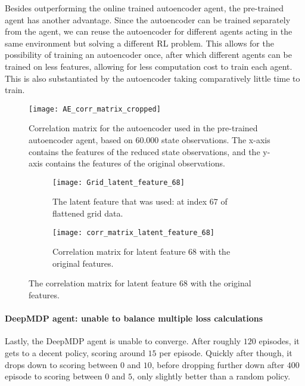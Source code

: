 Besides outperforming the online trained autoencoder agent, the pre-trained agent has another advantage. Since the autoencoder can be trained separately from the agent, we can reuse the autoencoder for different agents acting in the same environment but solving a different RL problem. This allows for the possibility of training an autoencoder once, after which different agents can be trained on less features, allowing for less computation cost to train each agent. This is also substantiated by the autoencoder taking comparatively little time to train.


\begin{figure}[h]
	\centering
	\texttt{[image: AE\_corr\_matrix\_cropped]}
	\caption{Correlation matrix for the autoencoder used in the pre-trained autoencoder agent, based on $60.000$ state observations. The x-axis contains the features of the reduced state observations, and the y-axis contains the features of the original observations.}
	\label{fig:ae-corr}
\end{figure}

\begin{figure}[h]
	\centering
	\begin{subfigure}[b]{0.2\textwidth}
		\texttt{[image: Grid\_latent\_feature\_68]}
		\caption{The latent feature that was used: at index $67$ of flattened grid data.}
		\label{fig:ae-latent-feature} 
	\end{subfigure}\hfill
	\begin{subfigure}[b]{0.75\textwidth}
		\texttt{[image: corr\_matrix\_latent\_feature\_68]}
		\caption{Correlation matrix for latent feature $68$ with the original features.}
		\label{fig:ae-latent-feature-corr-matrix}
	\end{subfigure}
	\caption{The correlation matrix for latent feature $68$ with the original features.}
	\label{fig:latent-feature-corr}
\end{figure}

\paragraph{DeepMDP agent: unable to balance multiple loss calculations}

Lastly, the DeepMDP agent is unable to converge. After roughly $120$ episodes, it gets to a decent policy, scoring around $15$ per episode. Quickly after though, it drops down to scoring between $0$ and $10$, before dropping further down after $400$ episode to scoring between $0$ and $5$, only slightly better than a random policy.

